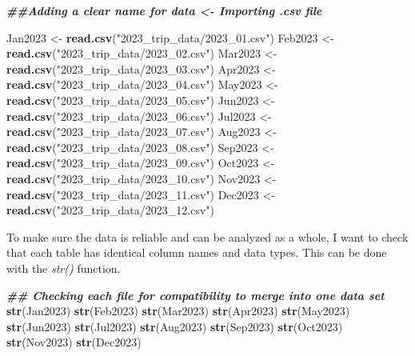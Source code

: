 \documentclass[
]{article}
\newenvironment{Shaded}{\begin{snugshade}}{\end{snugshade}}
\newcommand{\DocumentationTok}[1]{\textcolor[rgb]{0.56,0.35,0.01}{\textbf{\textit{#1}}}}
\newcommand{\FunctionTok}[1]{\textcolor[rgb]{0.13,0.29,0.53}{\textbf{#1}}}
\newcommand{\NormalTok}[1]{#1}
\newcommand{\OtherTok}[1]{\textcolor[rgb]{0.56,0.35,0.01}{#1}}
\newcommand{\StringTok}[1]{\textcolor[rgb]{0.31,0.60,0.02}{#1}}
\begin{document}
\begin{Shaded}
\begin{Highlighting}[]
\DocumentationTok{\#\#Adding a clear name for data \textless{}{-} Importing .csv file}

\NormalTok{Jan2023 }\OtherTok{\textless{}{-}} \FunctionTok{read.csv}\NormalTok{(}\StringTok{"2023\_trip\_data/2023\_01.csv"}\NormalTok{)}
\NormalTok{Feb2023 }\OtherTok{\textless{}{-}} \FunctionTok{read.csv}\NormalTok{(}\StringTok{"2023\_trip\_data/2023\_02.csv"}\NormalTok{)}
\NormalTok{Mar2023 }\OtherTok{\textless{}{-}} \FunctionTok{read.csv}\NormalTok{(}\StringTok{"2023\_trip\_data/2023\_03.csv"}\NormalTok{)}
\NormalTok{Apr2023 }\OtherTok{\textless{}{-}} \FunctionTok{read.csv}\NormalTok{(}\StringTok{"2023\_trip\_data/2023\_04.csv"}\NormalTok{)}
\NormalTok{May2023 }\OtherTok{\textless{}{-}} \FunctionTok{read.csv}\NormalTok{(}\StringTok{"2023\_trip\_data/2023\_05.csv"}\NormalTok{)}
\NormalTok{Jun2023 }\OtherTok{\textless{}{-}} \FunctionTok{read.csv}\NormalTok{(}\StringTok{"2023\_trip\_data/2023\_06.csv"}\NormalTok{)}
\NormalTok{Jul2023 }\OtherTok{\textless{}{-}} \FunctionTok{read.csv}\NormalTok{(}\StringTok{"2023\_trip\_data/2023\_07.csv"}\NormalTok{)}
\NormalTok{Aug2023 }\OtherTok{\textless{}{-}} \FunctionTok{read.csv}\NormalTok{(}\StringTok{"2023\_trip\_data/2023\_08.csv"}\NormalTok{)}
\NormalTok{Sep2023 }\OtherTok{\textless{}{-}} \FunctionTok{read.csv}\NormalTok{(}\StringTok{"2023\_trip\_data/2023\_09.csv"}\NormalTok{)}
\NormalTok{Oct2023 }\OtherTok{\textless{}{-}} \FunctionTok{read.csv}\NormalTok{(}\StringTok{"2023\_trip\_data/2023\_10.csv"}\NormalTok{)}
\NormalTok{Nov2023 }\OtherTok{\textless{}{-}} \FunctionTok{read.csv}\NormalTok{(}\StringTok{"2023\_trip\_data/2023\_11.csv"}\NormalTok{)}
\NormalTok{Dec2023 }\OtherTok{\textless{}{-}} \FunctionTok{read.csv}\NormalTok{(}\StringTok{"2023\_trip\_data/2023\_12.csv"}\NormalTok{)}
\end{Highlighting}
\end{Shaded}

To make sure the data is reliable and can be analyzed as a whole, I want
to check that each table has identical column names and data types. This
can be done with the \emph{str()} function.

\begin{Shaded}
\begin{Highlighting}[]
\DocumentationTok{\#\# Checking each file for compatibility to merge into one data set}
\FunctionTok{str}\NormalTok{(Jan2023)}
\FunctionTok{str}\NormalTok{(Feb2023)}
\FunctionTok{str}\NormalTok{(Mar2023)}
\FunctionTok{str}\NormalTok{(Apr2023)}
\FunctionTok{str}\NormalTok{(May2023)}
\FunctionTok{str}\NormalTok{(Jun2023)}
\FunctionTok{str}\NormalTok{(Jul2023)}
\FunctionTok{str}\NormalTok{(Aug2023)}
\FunctionTok{str}\NormalTok{(Sep2023)}
\FunctionTok{str}\NormalTok{(Oct2023)}
\FunctionTok{str}\NormalTok{(Nov2023)}
\FunctionTok{str}\NormalTok{(Dec2023)}
\end{Highlighting}
\end{Shaded}
\end{document}
